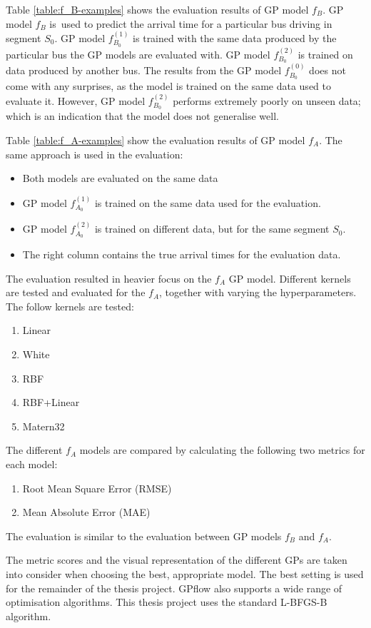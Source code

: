 Table \ref{table:f_B-examples} shows the evaluation results of GP model $f_B$.
GP model $f_B$ is used to predict the arrival time for a particular bus driving in segment $S_0$.
GP model $f^{(1)}_{B_0}$ is trained with the same data produced by the particular bus the GP models are evaluated with.
GP model $f^{(2)}_{B_0}$ is trained on data produced by another bus.
The results from the GP model $f^{(0)}_{B_0}$ does not come with any surprises, as the model is trained on the same data used to evaluate it.
However, GP model $f^{(2)}_{B_0}$ performs extremely poorly on unseen data; which is an indication that the model does not generalise well.

Table \ref{table:f_A-examples} show the evaluation results of GP model $f_A$.
The same approach is used in the evaluation:
\begin{itemize}
    \item Both models are evaluated on the same data
    \item GP model $f^{(1)}_{A_0}$ is trained on the same data used for the evaluation.
    \item GP model $f^{(2)}_{A_0}$ is trained on different data, but for the same segment $S_0$.
    \item The right column contains the true arrival times for the evaluation data.
\end{itemize}

The evaluation resulted in heavier focus on the $f_A$ GP model.
Different kernels are tested and evaluated for the $f_A$, together with varying the hyperparameters.
The follow kernels are tested:
\begin{enumerate}
    \item Linear 
    \item White
    \item RBF
    \item RBF+Linear
    \item Matern32
\end{enumerate}
The different $f_A$ models are compared by calculating the following two metrics for each model:
\begin{enumerate}
    \item Root Mean Square Error (RMSE)
    \item Mean Absolute Error (MAE)
\end{enumerate}
The evaluation is similar to the evaluation between GP models $f_B$ and $f_A$.

The metric scores and the visual representation of the different GPs are taken into consider when choosing the best, appropriate model.
The best setting is used for the remainder of the thesis project.
GPflow also supports a wide range of optimisation algorithms.
This thesis project uses the standard L-BFGS-B algorithm.

